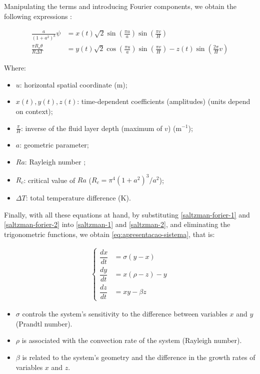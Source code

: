 \documentclass[12pt, a4paper]{article}
\begin{document}
Manipulating the terms and introducing Fourier components, we obtain the following expressions \cite{peitgen2013} \cite{Saltzman1962}:

\begin{align}
	\frac{a}{(1 + a^2)^k} \psi        & = x(t)\sqrt{2} \sin \left(\frac{\pi 
	u}{a}\right) \sin \left(\frac{\pi v}{H}\right) \label{saltzman-forier-1} \\
	\frac{\pi R_o \theta}{R \Delta T} & = y(t)\sqrt{2} \cos \left(\frac{\pi 
	u}{a}\right) \sin \left(\frac{\pi v}{H}\right)
	\label{saltzman-forier-2} - z(t)
	\sin \left(\frac{2\pi}{H}v\right)
\end{align}

Where:
\begin{itemize}
	\item $u$: horizontal spatial coordinate (m);
	\item $x(t), y(t), z(t)$: time-dependent coefficients (amplitudes) (units depend on context);
	\item $\frac{\pi}{H}$: inverse of the fluid layer depth (maximum of $v$) (m$^{-1}$);
	\item $a$: geometric parameter;
	\item $Ra$: Rayleigh number \cite{Rayleigh1916};
	\item $R_c$: critical value of $Ra$ ($R_c = \pi^4(1 + a^2)^3/a^2$);
	\item $\Delta T$: total temperature difference (K).
\end{itemize}

Finally, with all these equations at hand, by substituting \ref{saltzman-forier-1} and \ref{saltzman-forier-2} into \ref{saltzman-1} and \ref{saltzman-2}, and eliminating the trigonometric functions, we obtain \ref{eq:apresentacao-sistema}, that is:

\begin{align*}
	\begin{cases}
	\dfrac{dx}{dt} & = \sigma(y - x)   \\
	\dfrac{dy}{dt} & = x(\rho - z) - y \\
	\dfrac{dz}{dt} & = xy - \beta z    
	\end{cases}
\end{align*}

\begin{itemize}
	\item $\sigma$ controls the system's sensitivity to the difference between variables $x$ and $y$ (Prandtl number).
	\item $\rho$ is associated with the convection rate of the system (Rayleigh number).
	\item $\beta$ is related to the system's geometry and the difference in the growth rates of variables $x$ and $z$.
\end{itemize}
\end{document}
